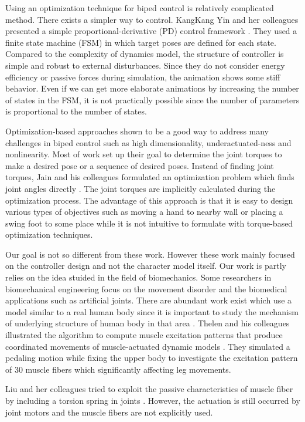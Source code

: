 \documentclass{acm_proc_article-sp}
\begin{document}
Using an optimization technique for biped control is relatively complicated method.
There exists a simpler way to control. KangKang Yin and her colleagues
presented a simple proportional-derivative (PD) control framework \cite{journals/tog/YinLP07}.
They used a finite state machine (FSM) in which target poses are defined
for each state. Compared to the complexity of dynamics model,
the structure of controller is simple and robust to external disturbances.
Since they do not consider energy efficiency or passive forces during
simulation, the animation shows some stiff behavior.
Even if we can get more elaborate animations by increasing
the number of states in the FSM, it is not practically possible since the
number of parameters is proportional to the number of states.

Optimization-based approaches shown to be a good way to address many challenges
in biped control such as high dimensionality, underactuated-ness and
nonlinearity. Most of work set up their goal to determine the joint
torques to make a desired pose or a sequence of desired poses.
Instead of finding joint torques, Jain and his colleagues formulated
an optimization problem which finds joint angles directly \cite{Jain:09:OIM}. The joint torques
are implicitly calculated during the optimization process. The advantage of
this approach is that it is easy to design various types of objectives such as
moving a hand to nearby wall or placing a swing foot to some place while it
is not intuitive to formulate with torque-based optimization techniques.


Our goal is not so different from these work. However these work mainly focused
on the controller design and not the character model itself. Our work is
partly relies on the idea stuided in the field of biomechanics.
Some researchers in biomechanical engineering focus on the movement
disorder and the biomedical applications such as artificial joints.
There are abundant work exist which use a model similar to
a real human body since it is important to study the mechanism of underlying
structure of human body in that area \cite{vr-305}. Thelen and his colleagues
illustrated
the algorithm to compute muscle excitation patterns that produce
coordinated movements of muscle-actuated dynamic models \cite{Thelen2003321}.
They simulated
a pedaling motion while fixing the upper body to investigate the excitation
pattern of 30 muscle fibers which significantly affecting leg movements.

Liu and her colleagues tried to exploit the passive characteristics of
muscle fiber by including a torsion spring in joints \cite{Liu:2005:LPB}.
However, the actuation
is still occurred by joint motors and the muscle fibers are not explicitly used.
\end{document}
